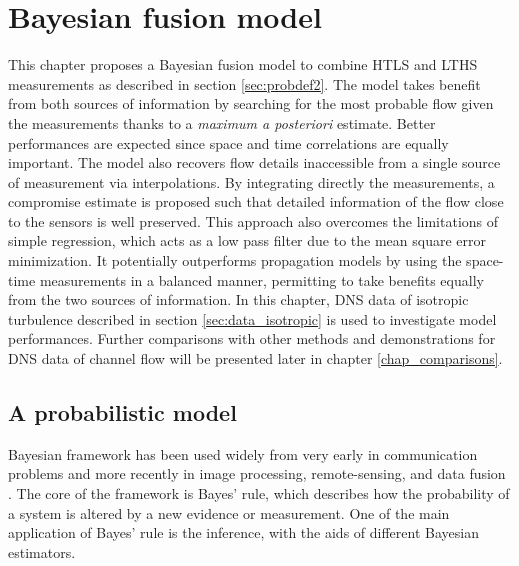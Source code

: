 \chapter{Bayesian fusion model} 
\label{chap_BayesianFusion} 

This chapter proposes a Bayesian fusion model \citep{van2015bayesian} to combine HTLS and LTHS measurements as described in section \ref{sec:probdef2}. The model takes benefit from both sources of information by searching for the most probable flow given the measurements thanks to a \textit{maximum a posteriori} estimate. Better performances are expected since space and time correlations are equally important. The model also recovers flow details inaccessible from a single source of measurement via interpolations. By integrating directly the measurements, a compromise estimate is proposed such that detailed information of the flow close to the sensors is well preserved. This approach also overcomes the limitations of simple regression, which acts as a low pass filter due to the mean square error minimization. It potentially outperforms propagation models by using the space-time measurements in a balanced manner, permitting to take benefits equally from the two sources of information. In this chapter, DNS data of isotropic turbulence described in section \ref{sec:data_isotropic} is used to investigate model performances. Further comparisons with other methods and demonstrations for DNS data of channel flow will be presented later in chapter \ref{chap_comparisons}.

\section{A probabilistic model}
Bayesian framework has been used widely from very early in communication problems \citep{van1967detection,sage1971estimation} and more recently in image processing, remote-sensing, and data fusion \citep{levitan1987maximum,ma2000simultaneous,challa2004bayesian,koks2003introduction,durrant2008multisensor,zhang2009noise,joshi2010map}. The core of the framework is Bayes' rule, which describes how the probability of a system is altered by a new evidence or measurement. One of the main application of Bayes' rule is the inference, with the aids of different Bayesian estimators. 

